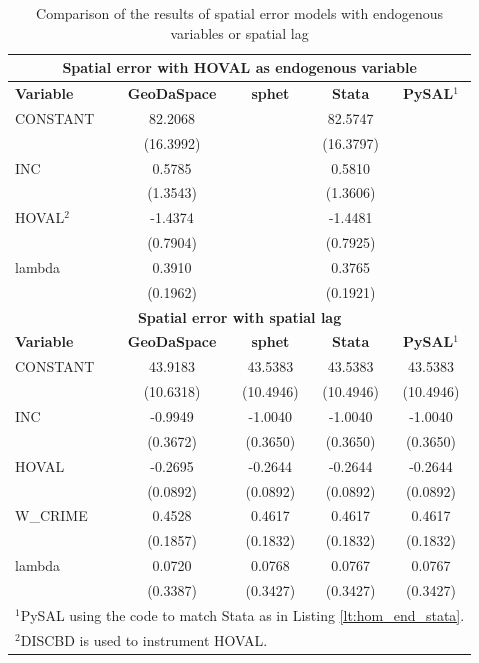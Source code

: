 \documentclass{article}
\begin{document}
\begin{table}[htpb]
\caption{Comparison of the results of spatial error models with endogenous variables or spatial lag}
\label{t:res_hom_endog}
\centering
\begin{small}
\begin{tabular}{l|cccc} \hline
\multicolumn{5}{c}{\textbf{Spatial error with HOVAL as endogenous variable}} \\ \hline
\textbf{Variable}&\textbf{GeoDaSpace}&\textbf{sphet}&\textbf{Stata}&\textbf{PySAL$^1$}\\ \hline
CONSTANT&82.2068&&82.5747&\\
&(16.3992)&&(16.3797)&\\
INC&0.5785&&0.5810&\\
&(1.3543)&&(1.3606)&\\
HOVAL$^2$&-1.4374&&-1.4481&\\
&(0.7904)&&(0.7925)&\\
lambda&0.3910&&0.3765&\\
&(0.1962)&&(0.1921)&\\
\hline
\multicolumn{5}{c}{\textbf{Spatial error with spatial lag}} \\ \hline
\textbf{Variable}&\textbf{GeoDaSpace}&\textbf{sphet}&\textbf{Stata}&\textbf{PySAL$^1$}\\ \hline
CONSTANT&43.9183&43.5383&43.5383&43.5383\\
&(10.6318)&(10.4946)&(10.4946)&(10.4946)\\
INC&-0.9949&-1.0040&-1.0040&-1.0040\\
&(0.3672)&(0.3650)&(0.3650)&(0.3650)\\
HOVAL&-0.2695&-0.2644&-0.2644&-0.2644\\
&(0.0892)&(0.0892)&(0.0892)&(0.0892)\\
W\_CRIME&0.4528&0.4617&0.4617&0.4617\\
&(0.1857)&(0.1832)&(0.1832)&(0.1832)\\
lambda&0.0720&0.0768&0.0767&0.0767\\
&(0.3387)&(0.3427)&(0.3427)&(0.3427)\\
\hline
\multicolumn{5}{l}{\scriptsize{$^1$PySAL using the code to match Stata as in Listing \ref{lt:hom_end_stata}.}} \\
\multicolumn{5}{l}{\scriptsize{$^2$DISCBD is used to instrument HOVAL.}} \\
\end{tabular}
\end{small}
\end{table}
\end{document}
